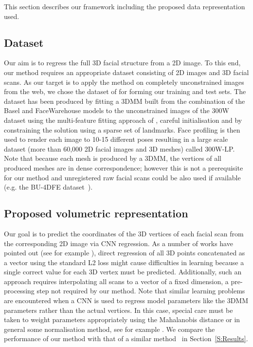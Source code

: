 This section describes our framework including the proposed data representation used.


\subsection{Dataset}

Our aim is to regress the full 3D facial structure from a 2D image. To
this end, our method requires an appropriate dataset consisting of 2D
images and 3D facial scans. As our target is to apply the method on
completely unconstrained images from the web, we chose the dataset of
\cite{zhu2016face} for forming our training and test sets. The dataset
has been produced by fitting a 3DMM built from the combination of the
Basel \cite{paysan20093d} and FaceWarehouse
\cite{cao2014facewarehouse} models to the unconstrained images of the
300W dataset \cite{sagonas2013semi} using the multi-feature fitting
approach of \cite{romdhani2005estimating}, careful initialisation and
by constraining the solution using a sparse set of landmarks. Face
profiling is then used to render each image to 10-15 different poses
resulting in a large scale dataset (more than 60,000 2D facial images
and 3D meshes) called 300W-LP. Note that because each mesh is
produced by a 3DMM, the vertices of all produced meshes are in dense
correspondence; however this is not a prerequisite for our method and
unregistered raw facial scans could be also used if available
(e.g. the BU-4DFE dataset~\cite{yin2008high}).

\subsection{Proposed volumetric representation}

Our goal is to predict the coordinates of the 3D vertices of each
facial scan from the corresponding 2D image via CNN regression. As a
number of works have pointed out (see for example
\cite{tompson2015efficient, pfister2015flowing}), direct regression of
all 3D points concatenated as a vector using the standard L2 loss
might cause difficulties in learning because a single correct value
for each 3D vertex must be predicted. Additionally, such an approach
requires interpolating all scans to a vector of a fixed dimension, a
pre-processing step not required by our method. Note that similar
learning problems are encountered when a CNN is used to regress model
parameters like the 3DMM parameters rather than the actual
vertices. In this case, special care must be taken to weight
parameters appropriately using the Mahalanobis distance or in general
some normalisation method, see for example \cite{zhu2016face}. We
compare the performance of our method with that of a similar
method~\cite{zhu2016face} in Section~\ref{S:Results}.

